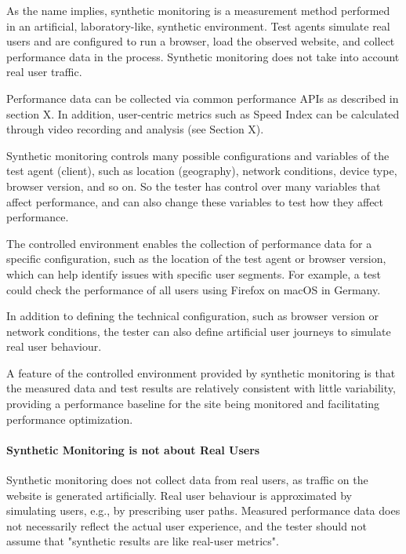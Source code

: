 As the name implies, synthetic monitoring is a measurement method performed in an artificial, laboratory-like, synthetic environment.
Test agents simulate real users and are configured to run a browser, load the observed website, and collect performance data in the process.
Synthetic monitoring does not take into account real user traffic. %

Performance data can be collected via common performance APIs as described in section X.
In addition, user-centric metrics such as Speed Index can be calculated through video recording and analysis (see Section X). %

Synthetic monitoring controls many possible configurations and variables of the test agent (client), such as location (geography), network conditions, device type, browser version, and so on. %
So the tester has control over many variables that affect performance, and can also change these variables to test how they affect performance.

The controlled environment enables the collection of performance data for a specific configuration, such as the location of the test agent or browser version, which can help identify issues with specific user segments.
For example, a test could check the performance of all users using Firefox on macOS in Germany. %

In addition to defining the technical configuration, such as browser version or network conditions, the tester can also define artificial user journeys to simulate real user behaviour. %

A feature of the controlled environment provided by synthetic monitoring is that the measured data and test results are relatively consistent with little variability, providing a performance baseline for the site being monitored and facilitating performance optimization. %


\paragraph{Synthetic Monitoring is not about Real Users} %

Synthetic monitoring does not collect data from real users, as traffic on the website is generated artificially.
Real user behaviour is approximated by simulating users, e.g., by prescribing user paths.
Measured performance data does not necessarily reflect the actual user experience, and the tester should not assume that "synthetic results are like real-user metrics". %

